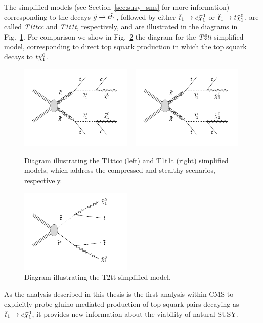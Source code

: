 The simplified models (see Section~\ref{sec:susy_sms} for more information) corresponding to the
decays $\tilde{g} \rightarrow t \tilde{t}_1$, followed by either $\tilde{t}_1 \rightarrow c \tilde{\chi}_1^0$ or
$\tilde{t}_1 \rightarrow t \tilde{\chi}_1^0$, are called \textit{T1ttcc} and \textit{T1t1t}, respectively, and are
illustrated in the diagrams in Fig.~\ref{fig:T1ttcc_T1t1t_diagrams}. For comparison we show in
Fig.~\ref{fig:T2tt_diagram} the diagram for the \textit{T2tt} simplified model, corresponding to
direct top squark production in which the top squark decays to $t \tilde{\chi}_1^0$. 

\begin{figure}
  \centering
  \includegraphics[width=0.48\textwidth,clip=true,trim=0 0.7cm 0 0]
{figures/razor_interpretation/T1ttcc}
  ~
  \includegraphics[width=0.48\textwidth,clip=true,trim=0 0.7cm 0 0]
{figures/razor_interpretation/T1t1t}
  \caption{Diagram illustrating the T1ttcc (left) and T1t1t (right) simplified models, which
address the compressed and stealthy scenarios, respectively.
  \label{fig:T1ttcc_T1t1t_diagrams}}
\end{figure}
\begin{figure}
  \centering
  \includegraphics[width=0.48\textwidth,clip=true,trim=0 0.7cm 0 0]{figures/razor_motivation/T2tt}
  \caption{Diagram illustrating the T2tt simplified model.
  \label{fig:T2tt_diagram}}
\end{figure}


As the analysis described in this thesis is the first analysis within CMS to explicitly probe
gluino-mediated production of top squark pairs decaying as $\tilde{t}_1 \rightarrow c \tilde{\chi}_1^0$, it
provides new information about the viability of natural SUSY. 

